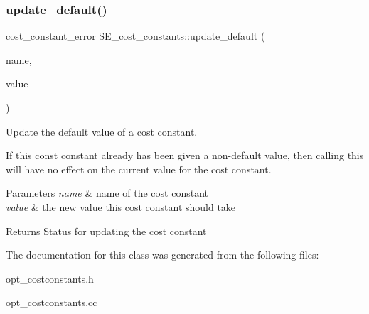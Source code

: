 \subsubsection{\texorpdfstring{update\+\_\+default()}{update\_default()}}
{\footnotesize\ttfamily cost\+\_\+constant\+\_\+error S\+E\+\_\+cost\+\_\+constants\+::update\+\_\+default (\begin{DoxyParamCaption}\item[{const L\+E\+X\+\_\+\+C\+S\+T\+R\+I\+NG \&}]{name,  }\item[{const double}]{value }\end{DoxyParamCaption})\hspace{0.3cm}{\ttfamily [protected]}}

Update the default value of a cost constant.

If this const constant already has been given a non-\/default value, then calling this will have no effect on the current value for the cost constant.


\begin{DoxyParams}{Parameters}
{\em name} & name of the cost constant \\
\hline
{\em value} & the new value this cost constant should take\\
\hline
\end{DoxyParams}
\begin{DoxyReturn}{Returns}
Status for updating the cost constant 
\end{DoxyReturn}


The documentation for this class was generated from the following files\+:\begin{DoxyCompactItemize}
\item 
opt\+\_\+costconstants.\+h\item 
opt\+\_\+costconstants.\+cc\end{DoxyCompactItemize}
